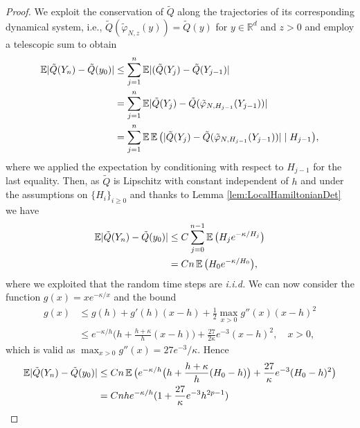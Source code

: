 \documentclass{siamart1116}
\numberwithin{theorem}{section}
\DeclarePairedDelimiter{\abs}{\lvert}{\rvert}
\renewcommand{\phi}{\varphi}
\newcommand{\R}{\mathbb{R}}
\newcommand{\E}{\operatorname{\mathbb{E}}}
\newcommand{\corr}[1]{{\color{red}#1}}
\begin{document}
\begin{proof} We exploit the conservation of $\tilde Q$ along the trajectories of its corresponding dynamical system, i.e., $\tilde Q (\tilde \phi_{N,z} (y)) = \tilde Q(y)$ for $y \in \R^d$ and $z > 0$ and employ a telescopic sum to obtain
\begin{equation}
\begin{aligned}
	\E \abs{\tilde Q(Y_n) - \tilde Q(y_0)} &\leq \sum_{j=1}^{n} \E\abs{(\tilde Q(Y_{j}) - \tilde Q(Y_{j-1})} \\
	&= \sum_{j=1}^{n} \E \abs{\tilde Q(Y_j) - \tilde Q(\tilde\phi_{N, H_{j-1}}(Y_{j-1}))} \\
	&= \sum_{j=1}^{n} \E\E\big(\abs{\tilde Q(Y_j) - \tilde Q (\tilde\phi_{N, H_{j-1}}(Y_{j-1}))} \mid H_{j-1}\big),
\end{aligned}
\end{equation}
where we applied the \corr{expectation by conditioning} with respect to $H_{j-1}$ for the last equality. Then, as \corr{$\tilde Q$} is Lipschitz with constant independent of $h$ and under the assumptions on $\{H_i\}_{i\geq 0}$ and thanks to Lemma \ref{lem:LocalHamiltonianDet} we have
\begin{equation}
\begin{aligned}
\E \abs{\tilde Q(Y_n) - \tilde Q(y_0)} &\leq C \sum_{j=0}^{n-1} \E\big(H_{j}e^{-\kappa/H_j}\big)\\
&= C n \E\big(H_0e^{-\kappa/H_0}\big),
\end{aligned}
\end{equation}
where \corr{we exploited that} the random time steps are \textit{i.i.d.} We can now consider the function $g(x) = xe^{-\kappa/x}$ and the bound
\begin{equation}
\begin{aligned}
	g(x) &\leq g(h) + g'(h) (x - h) + \frac{1}{2} \max_{x>0} g''(x) (x - h)^2 \\
	&\leq e^{-\kappa/h} \big(h + \frac{h + \kappa}{h}(x-h)\big) + \frac{27}{2\kappa}e^{-3} (x-h)^2, \quad x > 0,
\end{aligned}
\end{equation}
which is valid as $\max_{x>0} g''(x) = 27e^{-3}/\kappa$. Hence
\begin{equation}\label{eq:ErrorModifHamiltonian}
\begin{aligned}
\E \abs{\tilde Q(Y_n) - \tilde Q(y_0)} &\leq Cn \E\big( e^{-\kappa/h} \big(h + \frac{h + \kappa}{h}(H_0-h)\big) + \frac{27}{\kappa}e^{-3} (H_0-h)^2 \big) \\
&= Cnhe^{-\kappa/h}(1 + \frac{27}{\kappa}e^{-3} h^{2p-1}) \\

\end{aligned}
\end{equation}
\end{proof}
\end{document}
